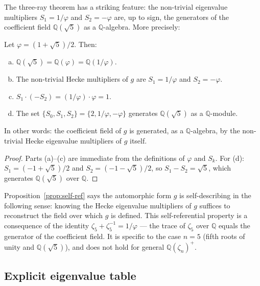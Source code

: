The three-ray theorem has a striking feature: the non-trivial eigenvalue
multipliers $S_1 = 1/\varphi$ and $S_2 = -\varphi$ are, up to sign,
the generators of the coefficient field $\mathbb{Q}(\sqrt{5})$ as a
$\mathbb{Q}$-algebra. More precisely:

\begin{proposition}
\label{prop:self-ref}
Let $\varphi = (1+\sqrt{5})/2$. Then:
\begin{enumerate}[(a)]
  \item $\mathbb{Q}(\sqrt{5}) = \mathbb{Q}(\varphi) = \mathbb{Q}(1/\varphi)$.
  \item The non-trivial Hecke multipliers of $g$ are
        $S_1 = 1/\varphi$ and $S_2 = -\varphi$.
  \item $S_1 \cdot (-S_2) = (1/\varphi) \cdot \varphi = 1$.
  \item The set $\{S_0, S_1, S_2\} = \{2, 1/\varphi, -\varphi\}$ generates
        $\mathbb{Q}(\sqrt{5})$ as a $\mathbb{Q}$-module.
\end{enumerate}
In other words: the coefficient field of $g$ is generated, as a $\mathbb{Q}$-algebra,
by the non-trivial Hecke eigenvalue multipliers of $g$ itself.
\end{proposition}

\begin{proof}
Parts (a)--(c) are immediate from the definitions of $\varphi$ and $S_k$.
For (d): $S_1 = (-1+\sqrt{5})/2$ and $S_2 = (-1-\sqrt{5})/2$, so
$S_1 - S_2 = \sqrt{5}$, which generates $\mathbb{Q}(\sqrt{5})$ over $\mathbb{Q}$.
\end{proof}

\begin{remark}[Interpretation]
Proposition~\ref{prop:self-ref} says the automorphic form $g$ is
self-describing in the following sense: knowing the Hecke eigenvalue
multipliers of $g$ suffices to reconstruct the field over which $g$ is
defined. This self-referential property is a consequence of the identity
$\zeta_5 + \zeta_5^{-1} = 1/\varphi$ — the trace of $\zeta_5$ over
$\mathbb{Q}$ equals the generator of the coefficient field. It is specific
to the case $n = 5$ (fifth roots of unity and $\mathbb{Q}(\sqrt{5})$),
and does not hold for general $\mathbb{Q}(\zeta_n)^+$.
\end{remark}

\subsection{Explicit eigenvalue table}
\label{subsec:three-ray-table}

